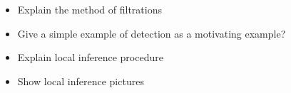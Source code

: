 
\begin{itemize}
\item Explain the method of filtrations

\item Give a simple example of detection as a motivating example?

\item Explain local inference procedure

\item Show local inference pictures


\end{itemize}

